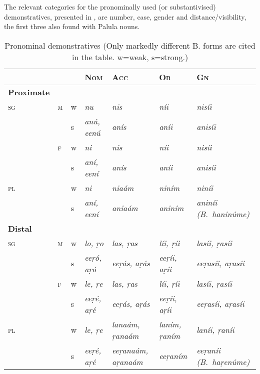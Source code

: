The relevant categories for the pronominally used (or substantivised) demonstratives, presented in
, are number, case, gender and distance/visibility, the first three also found with Palula
nouns.



\begin{table}[htp]
\caption{Pronominal demonstratives{\protect\footnotemark} (Only markedly different B. forms are cited in the table. w=weak, s=strong.)}
\begin{tabularx}{\textwidth}{ l l l Q Q Q P{23mm} }
\lsptoprule
&
&
&
\textsc{Nom} &
\textsc{Acc} &
\textsc{Ob} &
\textsc{Gn}\\\hline
\textbf{Proximate} &
&
&
&
&
&
\\
\textsc{sg} &
\textsc{m} &
w &
\textit{nu} &
\textit{nis} &
\textit{níi} &
\textit{nisíi} \\
&
&
s &
\textit{anú, eenú} &
\textit{anís} &
\textit{aníi} &
\textit{anisíi} \\
&
\textsc{f} &
w &
\textit{ni} &
\textit{nis} &
\textit{níi} &
\textit{nisíi} \\
&
&
s &
\textit{aní, eení} &
\textit{anís} &
\textit{aníi} &
\textit{anisíi} \\
\textsc{pl} &
&
w &
\textit{ni} &
\textit{niaám} &
\textit{niním} &
\textit{niníi} \\
&
&
s &
\textit{aní, eení} &
\textit{aniaám} &
\textit{aniním} &
\textit{aniníi (B.~haninúme)}\\
\textbf{Distal} &
&
&
&
&
&
\\
\textsc{sg} &
\textsc{m} &
w &
\textit{lo, ṛo} &
\textit{las, ṛas} &
\textit{líi, ṛíi} &
\textit{lasíi, ṛasíi} \\
&
&
s &
\textit{eeṛó, aṛó} &
\textit{eeṛás, aṛás} &
\textit{eeṛíi, aṛíi} &
\textit{eeṛasíi, aṛasíi} \\
&
\textsc{f} &
w &
\textit{le, ṛe} &
\textit{las, ṛas} &
\textit{líi, ṛíi} &
\textit{lasíi, ṛasíi} \\
&
&
s &
\textit{eeṛé, aṛé} &
\textit{eeṛás, aṛás} &
\textit{eeṛíi, aṛíi} &
\textit{eeṛasíi, aṛasíi} \\
\textsc{pl} &
&
w &
\textit{le, ṛe} &
\textit{lanaám, ṛanaám} &
\textit{laním, ṛaním} &
\textit{laníi, ṛaníi} \\
&
&
s &
\textit{eeṛé, aṛé} &
\textit{eeṛanaám, aṛanaám} &
\textit{eeṛaním} &
\textit{eeṛaníi (B.~haṛenúme)}\\

\end{tabularx}
\end{table}

